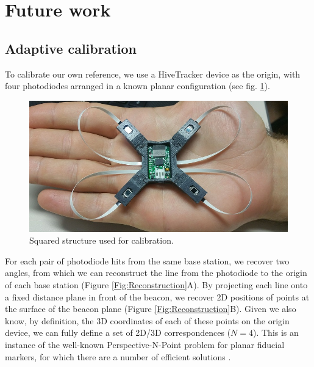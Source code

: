 \documentclass[sigchi]{acmart}
\begin{document}
\section{Future work}

\subsection{Adaptive calibration}

To calibrate our own reference, we use a HiveTracker device as the origin, with four photodiodes arranged in a known planar configuration (see fig. \ref{Fig:squared_structure}).

\begin{figure}[h]
  \centering
  \includegraphics[width=\linewidth]{Figures/squared_structure.jpg}
  \caption{Squared structure used for calibration.}
  \label{Fig:squared_structure}
\end{figure}

For each pair of photodiode hits from the same base station, we recover two angles, from which we can reconstruct the line from the photodiode to the origin of each base station (Figure \ref{Fig:Reconstruction}A). By projecting each line onto a fixed distance plane in front of the beacon, we recover 2D positions of points at the surface of the beacon plane (Figure \ref{Fig:Reconstruction}B). Given we also know, by definition, the 3D coordinates of each of these points on the origin device, we can fully define a set of 2D/3D correspondences ($N = 4$). This is an instance of the well-known Perspective-N-Point problem for planar fiducial markers, for which there are a number of efficient solutions \cite{Lepetit2008,Garrido-Jurado2014}.
\end{document}
